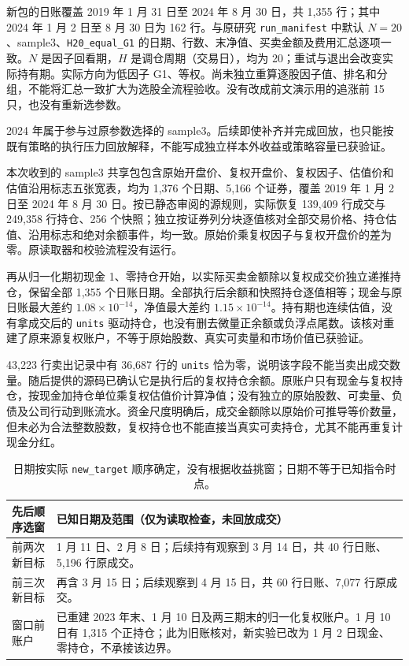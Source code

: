\par{}

新包的日账覆盖 2019 年 1 月 31 日至 2024 年 8 月 30 日，共 1,355 行；其中 2024 年 1 月 2 日至 8 月 30 日为 162 行。与原研究 \texttt{run\_manifest} 中默认 $N=20$、sample3、\texttt{H20\_equal\_G1} 的日期、行数、末净值、买卖金额及费用汇总逐项一致。$N$ 是因子回看期，$H$ 是调仓周期（交易日），均为 20；重试与退出会改变实际持有期。实际方向为低因子 G1、等权。尚未独立重算逐股因子值、排名和分组，不能将汇总一致扩大为选股全流程验收。没有改成前文演示用的追涨前 15 只，也没有重新选参数。

2024 年属于参与过原参数选择的 sample3。后续即使补齐并完成回放，也只能按既有策略的执行压力回放解释，不能写成独立样本外收益或策略容量已获验证。

本次收到的 sample3 共享包包含原始开盘价、复权开盘价、复权因子、估值价和估值沿用标志五张宽表，均为 1,376 个日期、5,166 个证券，覆盖 2019 年 1 月 2 日至 2024 年 8 月 30 日。按已静态审阅的源规则，实际恢复 139,409 行成交与 249,358 行持仓、256 个快照；独立按证券列分块逐值核对全部交易价格、持仓估值、沿用标志和绝对余额事件，均一致。原始价乘复权因子与复权开盘价的差为零。原读取器和校验流程没有运行。

再从归一化期初现金 1、零持仓开始，以实际买卖金额除以复权成交价独立递推持仓，保留全部 1,355 个日账日期。全部执行后余额和快照持仓逐值相等；现金与原日账最大差约 $1.08\times10^{-14}$，净值最大差约 $1.15\times10^{-14}$。持有期也连续估值，没有拿成交后的 \texttt{units} 驱动持仓，也没有删去微量正余额或负浮点尾数。该核对重建了原来源复权账户，不等于原始股数、真实可卖量和市场价值已获验证。

43,223 行卖出记录中有 36,687 行的 \texttt{units} 恰为零，说明该字段不能当卖出成交数量。随后提供的源码已确认它是执行后的复权持仓余额。原账户只有现金与复权持仓，按现金加持仓单位乘复权估值价计算净值；没有独立的原始股数、可卖量、负债及公司行动到账流水。资金尺度明确后，成交金额除以原始价可推导等价数量，但未必为合法整数股数，复权持仓也不能直接当真实可卖持仓，尤其不能再重复计现金分红。

\begin{table}[H]\centering\small
\begin{tabularx}{\linewidth}{p{31mm}Y}
\toprule 先后顺序选窗 & 已知日期及范围（仅为读取检查，未回放成交）\\\midrule
前两次新目标 & 1 月 11 日、2 月 8 日；后续持有观察到 3 月 14 日，共 40 行日账、5,196 行原成交。\\
前三次新目标 & 再含 3 月 15 日；后续观察到 4 月 15 日，共 60 行日账、7,077 行原成交。\\
窗口前账户 & 已重建 2023 年末、1 月 10 日及两三期末的归一化复权账户。1 月 10 日有 1,315 个正持仓；此为旧账核对，新实验已改为 1 月 2 日现金、零持仓，不承接该边界。\\
\bottomrule
\end{tabularx}
\caption{日期按实际 \texttt{new\_target} 顺序确定，没有根据收益挑窗；日期不等于已知指令时点。}
\end{table}

